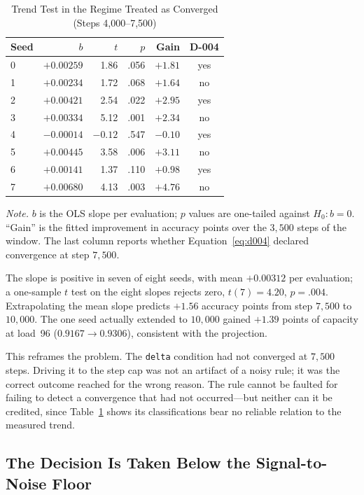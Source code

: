\documentclass[jou,11pt,donotrepeattitle]{apa7}
\begin{document}
\begin{table}[htbp]
\caption{Trend Test in the Regime Treated as Converged (Steps 4,000--7,500)}
\label{tab:tend}
\small
\begin{tabular}{lrrrrc}
\toprule
Seed & $b$ & $t$ & $p$ & Gain & D-004 \\
\midrule
0 & $+0.00259$ & 1.86 & .056 & $+1.81$ & yes \\
1 & $+0.00234$ & 1.72 & .068 & $+1.64$ & no \\
2 & $+0.00421$ & 2.54 & .022 & $+2.95$ & yes \\
3 & $+0.00334$ & 5.12 & .001 & $+2.34$ & no \\
4 & $-0.00014$ & $-0.12$ & .547 & $-0.10$ & yes \\
5 & $+0.00445$ & 3.58 & .006 & $+3.11$ & no \\
6 & $+0.00141$ & 1.37 & .110 & $+0.98$ & yes \\
7 & $+0.00680$ & 4.13 & .003 & $+4.76$ & no \\
\bottomrule
\end{tabular}

\vspace{5pt}
{\small\raggedright \textit{Note.} $b$ is the OLS slope per evaluation; $p$ values are one-tailed against
$H_0\colon b = 0$. ``Gain'' is the fitted improvement in accuracy points over the $3{,}500$ steps
of the window. The last column reports whether Equation~\ref{eq:d004} declared convergence at
step $7{,}500$.
\par}
\end{table}

The slope is positive in seven of eight seeds, with mean $+0.00312$ per evaluation; a one-sample
$t$ test on the eight slopes rejects zero, $t(7) = 4.20$, $p = .004$. Extrapolating the mean
slope predicts $+1.56$ accuracy points from step $7{,}500$ to $10{,}000$. The one seed actually
extended to $10{,}000$ gained $+1.39$ points of capacity at load~96 ($0.9167 \rightarrow
0.9306$), consistent with the projection.

This reframes the problem. The \texttt{delta} condition had not converged at $7{,}500$ steps.
Driving it to the step cap was not an artifact of a noisy rule; it was the correct outcome
reached for the wrong reason. The rule cannot be faulted for failing to detect a convergence
that had not occurred---but neither can it be credited, since Table~\ref{tab:tend} shows its
classifications bear no reliable relation to the measured trend.

\subsection{The Decision Is Taken Below the Signal-to-Noise Floor}
\end{document}
